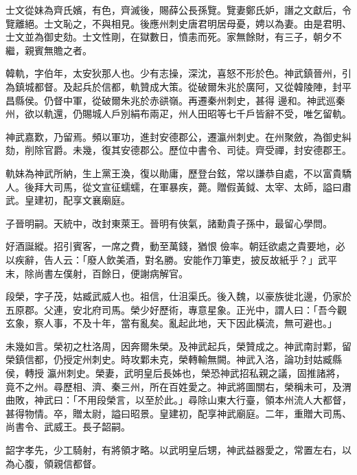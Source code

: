\begin{pinyinscope}
 士文從妹為齊氏嬪，有色，齊滅後，賜薛公長孫覽。覽妻鄭氏妒，譖之文獻后，令覽離絕。士文恥之，不與相見。後應州刺史唐君明居母憂，娉以為妻。由是君明、士文並為御史劾。士文性剛，在獄數日，憤恚而死。家無餘財，有三子，朝夕不繼，親賓無贍之者。



 韓軌，字伯年，太安狄那人也。少有志操，深沈，喜怒不形於色。神武鎮晉州，引為鎮城都督。及起兵於信都，軌贊成大策。從破爾朱兆於廣阿，又從韓陵陣，封平昌縣侯。仍督中軍，從破爾朱兆於赤谼嶺。再遷秦州刺史，甚得
 邊和。神武巡秦州，欲以軌還，仍賜城人戶別絹布兩疋，州人田昭等七千戶皆辭不受，唯乞留軌。



 神武嘉歎，乃留焉。頻以軍功，進封安德郡公，遷瀛州刺史。在州聚斂，為御史糾劾，削除官爵。未幾，復其安德郡公。歷位中書令、司徒。齊受禪，封安德郡王。



 軌妹為神武所納，生上黨王渙，復以勛庸，歷登台鉉，常以謙恭自處，不以富貴驕人。後拜大司馬，從文宣征蠕蠕，在軍暴疾，薨。贈假黃鉞、太宰、太師，謚曰肅武。皇建初，配享文襄廟庭。



 子晉明嗣。天統中，改封東萊王。晉明有俠氣，諸勳貴子孫中，最留心學問。



 好酒誕縱。招引賓客，一席之費，動至萬錢，猶恨
 儉率。朝廷欲處之貴要地，必以疾辭，告人云：「廢人飲美酒，對名勝。安能作刀筆吏，披反故紙乎？」武平末，除尚書左僕射，百餘日，便謝病解官。



 段榮，字子茂，姑臧武威人也。祖信，仕沮渠氏。後入魏，以豪族徙北邊，仍家於五原郡。父連，安北府司馬。榮少好歷術，專意星象。正光中，謂人曰：「吾今觀玄象，察人事，不及十年，當有亂矣。亂起此地，天下因此橫流，無可避也。」



 未幾如言。榮初之杜洛周，因奔爾朱榮。及神武起兵，榮贊成之。神武南討鄴，留榮鎮信都，仍授定州刺史。時攻鄴未克，榮轉輸無闕。神武入洛，論功封姑臧縣侯，轉授
 瀛州刺史。榮妻，武明皇后長姊也，榮恐神武招私親之議，固推諸將，竟不之州。尋歷相、濟、秦三州，所在百姓愛之。神武將圖關右，榮稱未可，及渭曲敗，神武曰：「不用段榮言，以至於此。」尋除山東大行臺，領本州流人大都督，甚得物情。卒，贈太尉，謚曰昭景。皇建初，配享神武廟庭。二年，重贈大司馬、尚書令、武威王。長子韶嗣。



 韶字孝先，少工騎射，有將領才略。以武明皇后甥，神武益器愛之，常置左右，以為心腹，領親信都督。




\end{pinyinscope}
